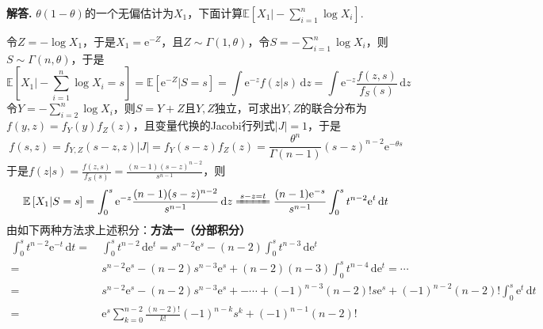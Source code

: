 \documentclass[12pt, a4paper, oneside]{ctexart}
\newenvironment{solution}[1][]{\par\noindent\textbf{#1解答. }}{\smallskip\par}  %
\def\E{\mathbb{E}}          %
\def\d{\mathrm{d}}          %
\def\e{\mathrm{e}}          %
\begin{document}
\begin{solution}
    $\theta(1-\theta)$的一个无偏估计为$X_1$，下面计算$\E\left[X_1\biggl|-\sum_{i=1}^n\log X_i\right]$.

    令$Z = -\log X_1$，于是$X_1 = \e^{-Z}$，且$Z\sim \Gamma(1,\theta)$，令$S = -\sum_{i=1}^n\log X_i$，则$S\sim \Gamma(n,\theta)$，于是
    \begin{equation*}
        \E\left[X_1\biggl|-\sum_{i=1}^n\log X_i = s\right] = \E\left[\e^{-Z}\biggl|S = s\right] = \int\e^{-z}f(z|s)\,\d z = \int\e^{-z}\frac{f(z,s)}{f_S(s)}\,\d z
    \end{equation*}
    令$Y = -\sum_{i=2}^n\log X_i$，则$S = Y+Z$且$Y,Z$独立，可求出$Y,Z$的联合分布为$f(y,z) = f_Y(y)f_Z(z)$，且变量代换的Jacobi行列式$|J| = 1$，于是
    \begin{equation*}
        f(s,z) = f_{Y,Z}(s-z,z)|J| = f_Y(s-z)f_Z(z) = \frac{\theta^n}{\Gamma(n-1)}(s-z)^{n-2}\e^{-\theta s}
    \end{equation*}
    于是$f(z|s) = \frac{f(z,s)}{f_S(s)} = \frac{(n-1)(s-z)^{n-2}}{s^{n-1}}$，则
    \begin{equation*}
        \E\left[X_1|S=s\right] = \int_0^s\e^{-z}\frac{(n-1)(s-z)^{n-2}}{s^{n-1}}\,\d z\xlongequal{s-z=t}\frac{(n-1)\e^{-s}}{s^{n-1}}\int_0^st^{n-2}\e^t\,\d t
    \end{equation*}
    由如下两种方法求上述积分：\textbf{方法一（分部积分）}
    \begin{align*}
        \int_0^st^{n-2}\e^{-t}\,\d t =&\ \int_0^st^{n-2}\,\d \e^{t} = s^{n-2}\e^s - (n-2)\int_0^st^{n-3}\,\d \e^t\\
        =&\ s^{n-2}\e^s - (n-2)s^{n-3}\e^s + (n-2)(n-3)\int_0^st^{n-4}\,\d \e^t=\cdots\\
        =&\ s^{n-2}\e^s - (n-2)s^{n-3}\e^s +-\cdots+(-1)^{n-3}(n-2)!s\e^{s}+(-1)^{n-2}(n-2)!\int_0^s\e^t\,\d t\\
        =&\ \e^{s}\sum_{k=0}^{n-2}\frac{(n-2)!}{k!}(-1)^{n-k}s^k+(-1)^{n-1}(n-2)!
    \end{align*}


\end{solution}
\end{document}
